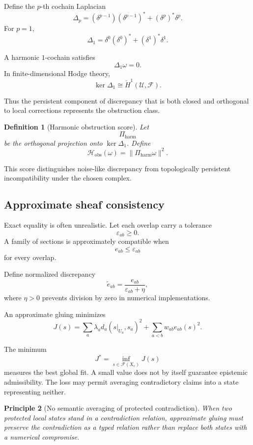 \documentclass[11pt]{article}
\newtheorem{definition}{Definition}[section]
\newtheorem{principle}[definition]{Principle}
\theoremstyle{definition}
\newcommand{\eps}{\varepsilon}
\begin{document}
Define the \(p\)-th cochain Laplacian
\[
\Delta_p
=
(\delta^{p-1})(\delta^{p-1})^{*}
+
(\delta^p)^{*}\delta^p.
\]
For \(p=1\),
\[
\Delta_1
=
\delta^0(\delta^0)^{*}
+
(\delta^1)^{*}\delta^1.
\]

A harmonic \(1\)-cochain satisfies
\[
\Delta_1\omega=0.
\]
In finite-dimensional Hodge theory,
\[
\ker\Delta_1
\cong
\check H^1(\mathcal U,\mathscr F).
\]

Thus the persistent component of discrepancy that is both closed and orthogonal to local corrections represents the obstruction class.

\begin{definition}[Harmonic obstruction score]
Let
\[
\Pi_{\mathrm{harm}}
\]
be the orthogonal projection onto \(\ker\Delta_1\). Define
\[
\mathcal H_{\mathrm{obs}}(\omega)
=
\|
\Pi_{\mathrm{harm}}\omega
\|^2.
\]
\end{definition}

This score distinguishes noise-like discrepancy from topologically persistent incompatibility under the chosen complex.

\subsection{Approximate sheaf consistency}

Exact equality is often unrealistic. Let each overlap carry a tolerance
\[
\eps_{ab}\geq0.
\]
A family of sections is approximately compatible when
\[
e_{ab}
\leq
\eps_{ab}
\]
for every overlap.

Define normalized discrepancy
\[
\widetilde e_{ab}
=
\frac{e_{ab}}{\eps_{ab}+\eta},
\]
where \(\eta>0\) prevents division by zero in numerical implementations.

An approximate gluing minimizes
\[
J(s)
=
\sum_a
\lambda_a
d_a
\left(
s|_{U_a},
s_a
\right)^2
+
\sum_{a<b}
w_{ab}
e_{ab}(s)^2.
\]

The minimum
\[
J^{*}
=
\inf_{s\in\mathscr F(X_c)}
J(s)
\]
measures the best global fit. A small value does not by itself guarantee epistemic admissibility. The loss may permit averaging contradictory claims into a state representing neither.

\begin{principle}[No semantic averaging of protected contradiction]
When two protected local states stand in a contradiction relation, approximate gluing must preserve the contradiction as a typed relation rather than replace both states with a numerical compromise.
\end{principle}
\end{document}
